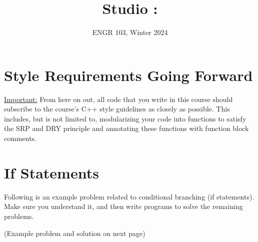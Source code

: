 \documentclass{article}
\title{
    Studio \studionumber: \studiotitle
}
\author{ENGR 103, Winter 2024}
\date{}
\begin{document}
\maketitle

\section{Style Requirements Going Forward}

\ul{Important:} From here on out, all code that you write in this course should subscribe to the course's C++ style guidelines as closely as possible. This includes, but is not limited to, modularizing your code into functions to satisfy the SRP and DRY principle and annotating these functions with function block comments.

\section{If Statements}

Following is an example problem related to conditional branching (if statements). Make sure you understand it, and then write programs to solve the remaining problems.

\vspace{12pt}

(Example problem and solution on next page)
\end{document}
